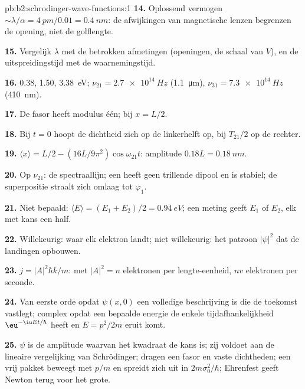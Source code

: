 \begin{solution}{pb:b2:schrodinger-wave-functions:1}
\textbf{14.} Oplossend vermogen
$\sim\lambda/\alpha = \qty{4}{pm}/0.01 = \qty{0.4}{nm}$: de
afwijkingen van magnetische lenzen begrenzen de opening, niet de golflengte.

\textbf{15.} Vergelijk $\lambda$ met de betrokken afmetingen (openingen, de
schaal van $V$), en de uitspreidingstijd met de waarnemingstijd.

\textbf{16.} \qty{0.38}{}, \qty{1.50}{}, \qty{3.38}{eV};
$\nu_{21} = \qty{2.7e14}{Hz}$
(\qty{1.1}{\micro m}), $\nu_{31} = \qty{7.3e14}{Hz}$ (\qty{410}{nm}).

\textbf{17.} De fasor heeft modulus één; bij $x = L/2$.

\textbf{18.} Bij $t = 0$ hoopt de dichtheid zich op de linkerhelft op, bij
$T_{21}/2$ op de rechter.

\textbf{19.} $\langle x\rangle = L/2 - (16L/9\pi^2)\cos\omega_{21}t$: amplitude
$0.18L = \qty{0.18}{nm}$.

\textbf{20.} Op $\nu_{21}$: de spectraallijn; een  heeft geen
trillende dipool en is stabiel; de superpositie straalt zich omlaag
tot $\varphi_1$.

\textbf{21.} Niet bepaald: $\langle E\rangle = (E_1 + E_2)/2 = \qty{0.94}{eV}$; een
meting geeft $E_1$ of $E_2$, elk met kans een half.

\textbf{22.} Willekeurig: waar elk elektron landt; niet willekeurig: het
patroon $|\psi|^2$ dat de landingen opbouwen.

\textbf{23.} $j = |A|^2\hbar k/m$: met $|A|^2 = n$ elektronen per lengte-eenheid,
$nv$ elektronen per seconde.

\textbf{24.} Van eerste orde opdat $\psi(x,0)$ een volledige beschrijving is
die de toekomst vastlegt; complex opdat een bepaalde energie de
enkele tijdafhankelijkheid $\eu^{-\iu Et/\hbar}$ heeft en $E = p^2/2m$ eruit komt.

\textbf{25.} $\psi$ is de amplitude waarvan het kwadraat de kans is; zij
voldoet aan de lineaire vergelijking van Schrödinger; 
dragen een
fasor en vaste dichtheden; een vrij pakket beweegt met $p/m$ en spreidt zich
uit in $2m\sigma_0^2/\hbar$; Ehrenfest geeft Newton terug voor het grote.
\end{solution}
